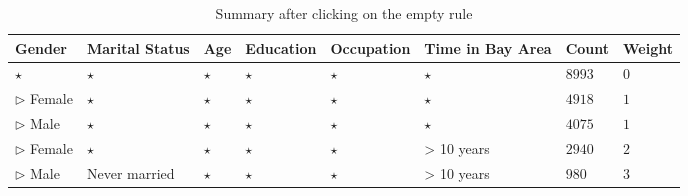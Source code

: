 \begin{table} 
\centering 
\begin{tabular}{| p{1.5cm} | p{1.5cm} | p{1.5cm} | p{1.5cm} | p{1.5cm} | p{1.5cm} | l | l |} 
\hline Gender & Marital Status & Age & Education & Occupation & Time in Bay Area & Count & Weight \\ \hline 
\cline{1-8} $\star$ & $\star$ & $\star$ & $\star$ & $\star$ & $\star$ & $8993$ & $0$ \\
\cline{1-1} \cline{2-2} \cline{3-3} \cline{4-4} \cline{5-5} \cline{6-6} \cline{7-8} $\triangleright$ Female & $\star$ & $\star$ & $\star$ & $\star$ & $\star$ & $4918$ & $1$ \\
\cline{1-1} \cline{2-2} \cline{3-3} \cline{4-4} \cline{5-5} \cline{6-6} \cline{7-8} $\triangleright$ Male & $\star$ & $\star$ & $\star$ & $\star$ & $\star$ & $4075$ & $1$ \\
\cline{1-1} \cline{2-2} \cline{3-3} \cline{4-4} \cline{5-5} \cline{6-6} \cline{7-8} $\triangleright$ Female & $\star$ & $\star$ & $\star$ & $\star$ & > 10 years & $2940$ & $2$ \\
\cline{1-1} \cline{2-2} \cline{3-3} \cline{4-4} \cline{5-5} \cline{6-6} \cline{7-8} $\triangleright$ Male & Never married & $\star$ & $\star$ & $\star$ & > 10 years & $980$ & $3$ \\
\hline 
\end{tabular} 
\caption{Summary after clicking on the empty rule \label{table:uiexample1}} 
\end{table} 

